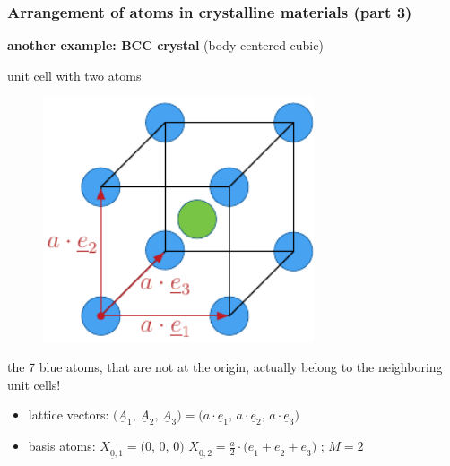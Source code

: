 \begin{frame}
  \frametitle{Arrangement of atoms in crystalline materials (part 3)}

  \textbf{another example: BCC crystal} (body centered cubic)
  \begin{multicols}{2}
    \noindent
    unit cell with two atoms
    
    \begin{figure}
      \centering
      \includegraphics[width=8cm, keepaspectratio=true]{sections/cosserat_rods/images/CrystalLatticeBBC}
    \end{figure}
    
    the 7 blue atoms, that are not at the origin, actually belong to the neighboring unit cells!
  
    \vspace{2em}
    \begin{itemize}
      \item lattice vectors: $\bigl( \underline{A}_1, \, \underline{A}_2, \, \underline{A}_3 \bigr) = \bigl( a \cdot \underline{e}_1, \, a \cdot \underline{e}_2 , \, a \cdot \underline{e}_3 \bigr)$
      \item basis atoms: \newline
        $\underline{X}_{\underline{0},1} = \bigl( 0 , \, 0 , \, 0 \bigr)$
        $\underline{X}_{\underline{0},2} = \frac{a}{2} \cdot \bigl( \underline{e}_1 + \underline{e}_2 + \underline{e}_3 \bigr)$ \: ; $M=2$
    \end{itemize}
  \end{multicols}
\end{frame}


